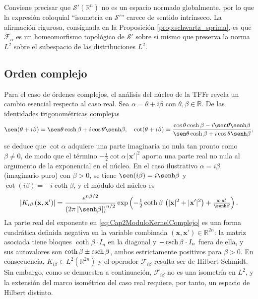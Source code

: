             \begin{remark}
                Conviene precisar que $\mathcal{S}'(\mathbb{R}^n)$ no es un espacio normado globalmente, por lo que la expresión coloquial ``isometría en $\mathcal{S}'$'' carece de sentido intrínseco. La afirmación rigurosa, consignada en la Proposición \ref{prop:schwartz_sprima}, es que $\tilde{\mathcal{F}}_\alpha$ es un homeomorfismo topológico de $\mathcal{S}'$ sobre sí mismo que preserva la norma $L^2$ sobre el subespacio de las distribuciones $L^2$.
            \end{remark}

       \subsection{Orden complejo}\label{sec:complex}

            Para el caso de órdenes complejos, el análisis del núcleo de la TFFr revela un cambio esencial respecto al caso real. Sea $\alpha = \theta + i\beta$ con $\theta, \beta \in \mathbb{R}$. De las identidades trigonométricas complejas
            \begin{equation*}
                \sen(\theta + i\beta) = \sen\theta\cosh\beta + i\cos\theta\senh\beta,
                \quad \cot(\theta+i\beta) = \frac{\cos\theta\cosh\beta - i\sen\theta\senh\beta}{\sen\theta\cosh\beta+i\cos\theta\senh\beta},
            \end{equation*}
            se deduce que $\cot\alpha$ adquiere una parte imaginaria no nula tan pronto como $\beta \neq 0$, de modo que el término $-\tfrac{i}{2}\cot\alpha\,|\mathbf{x}'|^2$ aporta una parte real no nula al argumento de la exponencial en el núcleo. En el caso ilustrativo $\alpha = i\beta$ (imaginario puro) con $\beta>0$, se tiene $\sen(i\beta) = i\senh\beta$ y $\cot(i\beta) = -i\coth\beta$, y el módulo del núcleo es
            \begin{equation}\label{eq:Cap2ModuloKernelComplejo}
                \left| K_{i\beta} \left(\mathbf{x},\mathbf{x}'\right) \right| = \frac{e^{n\beta/2}}{\left(2\pi \left|\senh\beta \right|\right)^{n/2}} \exp\left( -\tfrac{1}{2}\coth\beta\,\left(|\mathbf{x}|^2+|\mathbf{x}'|^2\right) + \tfrac{\mathbf{x}\cdot\mathbf{x}'}{\senh\beta} \right).
            \end{equation}
            La parte real del exponente en \eqref{eq:Cap2ModuloKernelComplejo} es una forma cuadrática definida negativa en la variable combinada $(\mathbf{x},\mathbf{x}')\in\mathbb{R}^{2n}$: la matriz asociada tiene bloques $\coth\beta\cdot I_n$ en la diagonal y $-\csch\beta\cdot I_n$ fuera de ella, y sus autovalores son $\coth\beta \pm \csch\beta$, ambos estrictamente positivos para $\beta>0$. En consecuencia, $K_{i\beta}\in L^2(\mathbb{R}^{2n})$ y el operador $\mathcal{F}_{i\beta}$ resulta ser de Hilbert-Schmidt. Sin embargo, como se demuestra a continuación, $\mathcal{F}_{i\beta}$ no es una isometría en $L^2$, y la extensión del marco isométrico del caso real requiere, por tanto, un espacio de Hilbert distinto.


